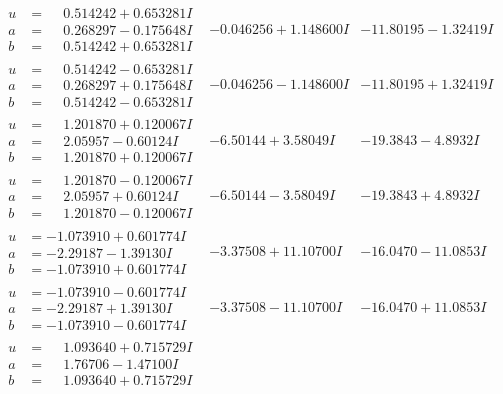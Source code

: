 \documentclass[1p]{elsarticle_modified}
\theoremstyle{definition}
\begin{document}
$$\begin{array}{c|c|c}
\begin{aligned}
u &= \phantom{-}0.514242 + 0.653281 I \\
a &= \phantom{-}0.268297 - 0.175648 I \\
b &= \phantom{-}0.514242 + 0.653281 I\end{aligned}
 & -0.046256 + 1.148600 I & -11.80195 - 1.32419 I \\ \hline\begin{aligned}
u &= \phantom{-}0.514242 - 0.653281 I \\
a &= \phantom{-}0.268297 + 0.175648 I \\
b &= \phantom{-}0.514242 - 0.653281 I\end{aligned}
 & -0.046256 - 1.148600 I & -11.80195 + 1.32419 I \\ \hline\begin{aligned}
u &= \phantom{-}1.201870 + 0.120067 I \\
a &= \phantom{-}2.05957 - 0.60124 I \\
b &= \phantom{-}1.201870 + 0.120067 I\end{aligned}
 & -6.50144 + 3.58049 I & -19.3843 - 4.8932 I \\ \hline\begin{aligned}
u &= \phantom{-}1.201870 - 0.120067 I \\
a &= \phantom{-}2.05957 + 0.60124 I \\
b &= \phantom{-}1.201870 - 0.120067 I\end{aligned}
 & -6.50144 - 3.58049 I & -19.3843 + 4.8932 I \\ \hline\begin{aligned}
u &= -1.073910 + 0.601774 I \\
a &= -2.29187 - 1.39130 I \\
b &= -1.073910 + 0.601774 I\end{aligned}
 & -3.37508 + 11.10700 I & -16.0470 - 11.0853 I \\ \hline\begin{aligned}
u &= -1.073910 - 0.601774 I \\
a &= -2.29187 + 1.39130 I \\
b &= -1.073910 - 0.601774 I\end{aligned}
 & -3.37508 - 11.10700 I & -16.0470 + 11.0853 I \\ \hline\begin{aligned}
u &= \phantom{-}1.093640 + 0.715729 I \\
a &= \phantom{-}1.76706 - 1.47100 I \\
b &= \phantom{-}1.093640 + 0.715729 I\end{aligned}

\end{array}$$
\end{document}
